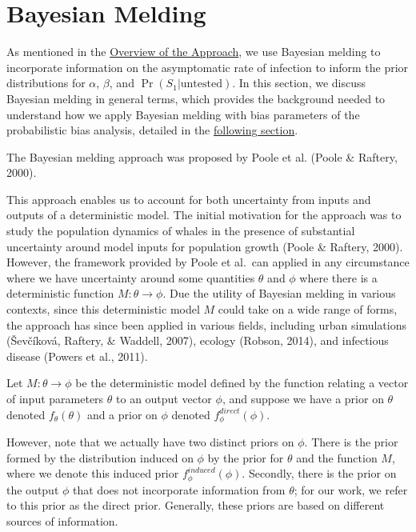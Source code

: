 \documentclass[12pt,twoside]{smiththesis}
\begin{document}
\hypertarget{bayesian-melding}{%
\section{Bayesian Melding}\label{bayesian-melding}}

As mentioned in the \protect\hyperlink{overview}{Overview of the Approach}, we use Bayesian melding to incorporate information on the asymptomatic rate of infection to inform the prior distributions for \(\alpha\), \(\beta\), and \(\Pr(S_1|\text{untested})\). In this section, we discuss Bayesian melding in general terms, which provides the background needed to understand how we apply Bayesian melding with bias parameters of the probabilistic bias analysis, detailed in the \protect\hyperlink{meld}{following section}.

The Bayesian melding approach was proposed by Poole et al. (Poole \& Raftery, 2000).

This approach enables us to account for both uncertainty from inputs and outputs of a deterministic model. The initial motivation for the approach was to study the population dynamics of whales in the presence of substantial uncertainty around model inputs for population growth (Poole \& Raftery, 2000). However, the framework provided by Poole et al.~can applied in any circumstance where we have uncertainty around some quantities \(\theta\) and \(\phi\) where there is a deterministic function \(M:\theta \to\phi\). Due the utility of Bayesian melding in various contexts, since this deterministic model \(M\) could take on a wide range of forms, the approach has since been applied in various fields, including urban simulations (Ševčíková, Raftery, \& Waddell, 2007), ecology (Robson, 2014), and infectious disease (Powers et al., 2011).

Let \(M: \theta \to \phi\) be the deterministic model defined by the function relating a vector of input parameters \(\theta\) to an output vector \(\phi\), and suppose we have a prior on \(\theta\) denoted \(f_\theta(\theta)\) and a prior on \(\phi\) denoted \(f_\phi^{direct}(\phi)\).

However, note that we actually have two distinct priors on \(\phi\). There is the prior formed by the distribution induced on \(\phi\) by the prior for \(\theta\) and the function \(M\), where we denote this induced prior \(f_\phi^{induced}(\phi)\). Secondly, there is the prior on the output \(\phi\) that does not incorporate information from \(\theta\); for our work, we refer to this prior as the direct prior. Generally, these priors are based on different sources of information.
\end{document}
